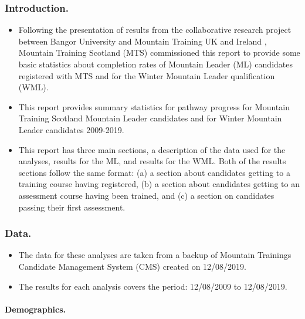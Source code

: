 \documentclass[
  12pt,
  a4paper,
]{book}
\providecommand{\tightlist}{%
  \setlength{\itemsep}{0pt}\setlength{\parskip}{0pt}}
\begin{document}
\hypertarget{mts-part-a-intro}{%
\subsubsection{Introduction.}\label{mts-part-a-intro}}

\begin{itemize}
\tightlist
\item
  Following the presentation of results from the collaborative research project between Bangor University and Mountain Training UK and Ireland \citep{Hardy2019b}, Mountain Training Scotland (MTS) commissioned this report to provide some basic statistics about completion rates of Mountain Leader (ML) candidates registered with MTS and for the Winter Mountain Leader qualification (WML).
\item
  This report provides summary statistics for pathway progress for Mountain Training Scotland Mountain Leader candidates and for Winter Mountain Leader candidates 2009-2019.
\item
  This report has three main sections, a description of the data used for the analyses, results for the ML, and results for the WML. Both of the results sections follow the same format: (a) a section about candidates getting to a training course having registered, (b) a section about candidates getting to an assessment course having been trained, and (c) a section on candidates passing their first assessment.
\end{itemize}

\hypertarget{mts-part-a-data}{%
\subsubsection{Data.}\label{mts-part-a-data}}

\begin{itemize}
\tightlist
\item
  The data for these analyses are taken from a backup of Mountain Trainings Candidate Management System (CMS) created on 12/08/2019.
\item
  The results for each analysis covers the period: 12/08/2009 to 12/08/2019.
\end{itemize}

\hypertarget{mts-part-a-demographics}{%
\paragraph{Demographics.}\label{mts-part-a-demographics}}
\end{document}

